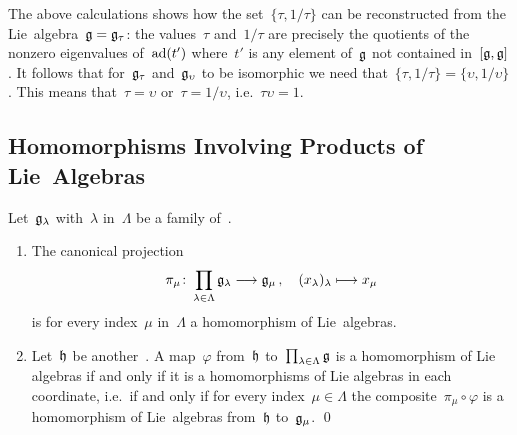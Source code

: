 \begin{example}
  The above calculations shows how the set~$\{ \tau, 1 / \tau \}$ can be reconstructed from the Lie~algebra~$\mathfrak{g} = \mathfrak{g}_\tau$:
  the values~$\tau$ and~$1/\tau$ are precisely the quotients of the nonzero eigenvalues of~$\operatorname{ad}(t')$ where~$t'$ is any element of~$\mathfrak{g}$ not contained in~$[\mathfrak{g}, \mathfrak{g}]$.
  It follows that for~$\mathfrak{g}_\tau$ and~$\mathfrak{g}_\upsilon$ to be isomorphic we need that~$\{ \tau , 1/\tau \} = \{ \upsilon, 1/\upsilon \}$.
  This means that~$\tau = \upsilon$ or~$\tau = 1 / \upsilon$, i.e.~$\tau \upsilon = 1$.
\end{example}



\subsection{Homomorphisms Involving Products of Lie~Algebras}


\begin{proposition}
  \label{products of lie algebras}
  Let~$\mathfrak{g}_\lambda$ with~$\lambda$ in~$\Lambda$ be a family of~\liealgebras{$\kf$}.
  \begin{enumerate}
    \item
      The canonical projection
      \[
       \pi_\mu
       \colon
       \prod_{\lambda \in \Lambda} \glie_\lambda
       \to
       \glie_\mu \,,
       \quad
       ( x_\lambda )_\lambda
       \mapsto
       x_\mu
      \]
      is for every index~$\mu$ in~$\Lambda$ a homomorphism of Lie~algebras.
    \item
      Let~$\mathfrak{h}$ be another~\liealgebra{$\kf$}.
      A map~$\varphi$ from~$\mathfrak{h}$ to~$\prod_{\lambda \in \Lambda} \mathfrak{g}$ is a homomorphism of Lie algebras if and only if it is a homomorphisms of Lie algebras in each coordinate, i.e.\ if and only if for every index~$\mu \in \Lambda$ the composite~$\pi_\mu \circ \varphi$ is a homomorphism of Lie~algebras from~$\mathfrak{h}$ to~$\mathfrak{g}_\mu$.
    \qed
  \end{enumerate}
\end{proposition}


